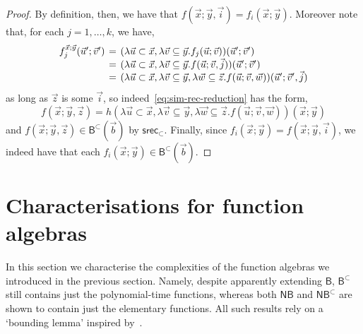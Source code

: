 \documentclass[manuscript,screen]{acmart}
\newcommand{\anupam}[1]{\todo{A: #1}}
\newcommand{\gianluca}[1]{\todo{G: #1}}
\theoremstyle{definition}
\theoremstyle{remark}
\newcommand{\permpref}{\subset}
\newcommand{\permprefeq}{\subseteq}
\newcommand{\permi}[1]{\vec{#1}}
\newcommand{\saferec}{\mathsf{srec}}
\newcommand{\saferecwfpo}[1]{\saferec_{#1}}
\newcommand{\srecwfpo}[1]{\saferecwfpo{#1}}
\newcommand{\srecpp}{\srecwfpo{\permpref}}
\newcommand{\bc}{\mathsf{B}}
\newcommand{\bcwfpo}[1]{\bc^{#1}}
\newcommand{\nested}{\mathsf{N}}
\newcommand{\nbc}{\nested\bc}
\newcommand{\nbcwfpo}[1]{\nested\bcwfpo{#1}}
\newcommand{\bcpp}{\bcwfpo{\permpref}}
\newcommand{\nbcpp}{\nbcwfpo{\permpref}}
\begin{document}
\begin{proof}
By definition, then, we have that $f(\vec x;\vec y, \permi i) = f_i (\vec x; \vec y)$.
Moreover note that, for each $j=1,\dots,k$, we have,
\[
\arraycolsep=2pt
\begin{array}{rcl}
   f_j^{\vec x;\vec y} (\vec u'; \vec v')  &=& (\lambda \vec u \permpref \vec x, \lambda \vec v \permprefeq \vec y. f_j(\vec u;\vec v)) (\vec u';\vec v') \\
    & = & (\lambda \vec u \permpref \vec x, \lambda \vec v \permprefeq \vec y. f(\vec u;\vec v,\permi j ))(\vec u';\vec v') \\
    & = & (\lambda \vec u \permpref \vec x, \lambda \vec v \permprefeq \vec y, \lambda \vec w \permprefeq \vec z . f(\vec u;\vec v, \vec w)) (\vec u';\vec v',\permi j)
\end{array}
\]
as long as $\vec z$ is some $\vec i$,
so indeed~\eqref{eq:sim-rec-reduction} has the form,
\[
f(\vec x; \vec y, \vec z) = h (\lambda \vec u \permpref \vec x, \lambda \vec v \permprefeq \vec y, \lambda \vec w \permprefeq \vec z . f(\vec u; \vec v, \vec w)) (\vec x;\vec y)
\]
and $f(\vec x;\vec y,\vec z) \in \bcpp(\vec b)$ by $\srecpp$.
Finally, since  $f_i(\vec x;\vec y) = f(\vec x;\vec y, \permi i)$, we indeed have that each $f_i(\vec x;\vec y) \in \bcpp(\vec b)$.
\end{proof}
\section{Characterisations for function algebras}\label{sec:characterization-results-for-function-algebras}
In this section we characterise the complexities  of the function algebras we introduced in the previous section. 
Namely, despite apparently extending $\bc$, $\bcpp$ still contains just the polynomial-time functions, whereas  both  $\nbc$ and $\nbcpp$ are shown to contain just the elementary functions. 
All such results rely on a `bounding lemma' inspired by~\cite{BellantoniCook}.
\end{document}
